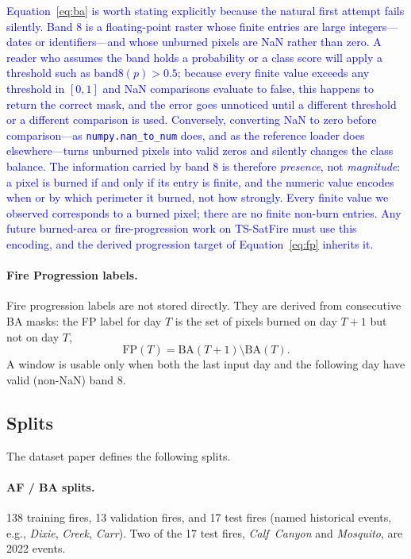 \documentclass[sensors,article,submit,moreauthors,pdftex]{Definitions/mdpi}
\newcommand{\rev}[1]{\textcolor{blue}{#1}}
\begin{document}
\rev{Equation~\ref{eq:ba} is worth stating explicitly because the natural first
attempt fails silently. Band 8 is a floating-point raster whose finite entries
are large integers---dates or identifiers---and whose unburned pixels are NaN
rather than zero. A reader who assumes the band holds a probability or a class
score will apply a threshold such as $\mathrm{band8}(p) > 0.5$; because every
finite value exceeds any threshold in $[0,1]$ and NaN comparisons evaluate to
false, this happens to return the correct mask, and the error goes unnoticed
until a different threshold or a different comparison is used. Conversely,
converting NaN to zero before comparison---as \texttt{numpy.nan\_to\_num} does,
and as the reference loader does elsewhere---turns unburned pixels into valid
zeros and silently changes the class balance. The information carried by band 8
is therefore \emph{presence}, not \emph{magnitude}: a pixel is burned if and
only if its entry is finite, and the numeric value encodes when or by which
perimeter it burned, not how strongly. Every finite value we observed
corresponds to a burned pixel; there are no finite non-burn entries. Any future
burned-area or fire-progression work on TS-SatFire must use this encoding, and
the derived progression target of Equation~\ref{eq:fp} inherits it.}

\paragraph*{Fire Progression labels.} Fire progression labels are not stored directly. They are derived from consecutive BA masks: the FP label for day $T$ is the set of pixels burned on day $T+1$ but not on day $T$,
\begin{equation}
\mathrm{FP}(T) = \mathrm{BA}(T+1) \setminus \mathrm{BA}(T).
\label{eq:fp}
\end{equation}
A window is usable only when both the last input day and the following day have valid (non-NaN) band 8.

\subsection{Splits}

The dataset paper defines the following splits.

\paragraph*{AF / BA splits.} 138 training fires, 13 validation fires, and 17 test fires (named historical events, e.g., \textit{Dixie}, \textit{Creek}, \textit{Carr}). Two of the 17 test fires, \textit{Calf~Canyon} and \textit{Mosquito}, are 2022 events.
\end{document}
